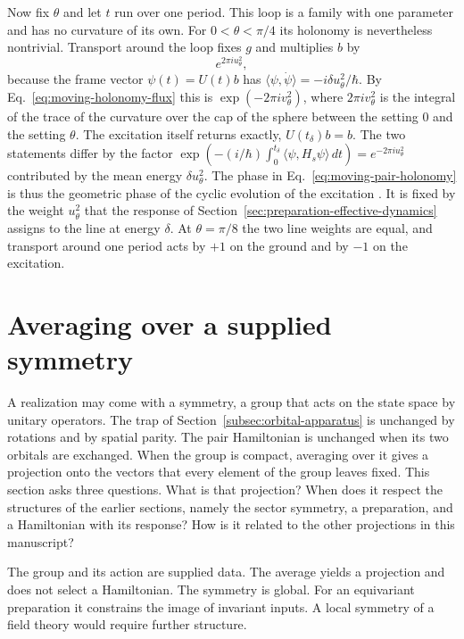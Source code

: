 \documentclass[11pt]{article}
\theoremstyle{definition}
\begin{document}
Now fix $\theta$ and let $t$ run over one period. This loop is a family with one parameter and has no curvature of its own. For $0<\theta<\pi/4$ its holonomy is nevertheless nontrivial. Transport around the loop fixes $g$ and multiplies $b$ by
\begin{equation}
 e^{2\pi iu_\theta^2} ,
 \label{eq:moving-pair-holonomy}
\end{equation}
because the frame vector $\psi(t)=U(t)b$ has $\langle\psi,\dot\psi\rangle=-i\delta u_\theta^2/\hbar$. By Eq.~\eqref{eq:moving-holonomy-flux} this is $\exp(-2\pi iv_\theta^2)$, where $2\pi iv_\theta^2$ is the integral of the trace of the curvature over the cap of the sphere between the setting $0$ and the setting $\theta$. The excitation itself returns exactly, $U(t_\delta)b=b$. The two statements differ by the factor $\exp(-(i/\hbar)\int_0^{t_\delta}\langle\psi,H_s\psi\rangle\,dt)=e^{-2\pi iu_\theta^2}$ contributed by the mean energy $\delta u_\theta^2$. The phase in Eq.~\eqref{eq:moving-pair-holonomy} is thus the geometric phase of the cyclic evolution of the excitation \cite{AharonovAnandan1987}. It is fixed by the weight $u_\theta^2$ that the response of Section~\ref{sec:preparation-effective-dynamics} assigns to the line at energy $\delta$. At $\theta=\pi/8$ the two line weights are equal, and transport around one period acts by $+1$ on the ground and by $-1$ on the excitation.

\section{Averaging over a supplied symmetry}
\label{sec:symmetry-average}

A realization may come with a symmetry, a group that acts on the state space by unitary operators. The trap of Section~\ref{subsec:orbital-apparatus} is unchanged by rotations and by spatial parity. The pair Hamiltonian is unchanged when its two orbitals are exchanged. When the group is compact, averaging over it gives a projection onto the vectors that every element of the group leaves fixed. This section asks three questions. What is that projection? When does it respect the structures of the earlier sections, namely the sector symmetry, a preparation, and a Hamiltonian with its response? How is it related to the other projections in this manuscript?

The group and its action are supplied data. The average yields a projection and does not select a Hamiltonian. The symmetry is global. For an equivariant preparation it constrains the image of invariant inputs. A local symmetry of a field theory would require further structure.
\end{document}
